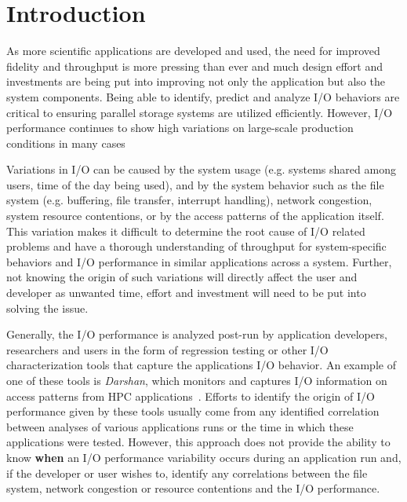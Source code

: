 \section{Introduction}
As more scientific applications are developed and used, the need for
improved fidelity and throughput is more pressing than ever and much
design effort and investments are being put into improving not only
the application but also the system components. Being able to
identify, predict and analyze I/O behaviors are critical to ensuring
parallel storage systems are utilized efficiently. However, I/O
performance continues to show high variations on large-scale
production conditions in many cases~\cite{costa2021}

Variations in I/O can be caused by the system usage (e.g. systems
shared among users, time of the day being used), and by the system
behavior such as the file system (e.g. buffering, file transfer,
interrupt handling), network congestion, system resource contentions,
or by the access patterns of the application itself. 
This variation
makes it difficult to determine the root cause of I/O related problems
and have a thorough understanding of throughput for system-specific
behaviors and I/O performance in similar applications across a
system. Further, not knowing the origin of such variations will
directly affect the user and developer as unwanted time, effort and
investment will need to be put into solving the issue.

Generally, the I/O performance is analyzed post-run by application
developers, researchers and users in the form of regression testing or
other I/O characterization tools that capture the applications I/O
behavior. An example of one of these tools is \emph{Darshan}, which
monitors and captures I/O information on access patterns from HPC
applications~\cite{Darshan}.
Efforts to identify the origin of I/O performance given by these tools
usually come from any identified correlation between analyses of
various applications runs or the time in which these applications were
tested. However, this approach does not provide the ability to know
\textbf{when} an I/O performance variability occurs during an
application run and, if the developer or user wishes to, identify any
correlations between the file system, network congestion or resource
contentions and the I/O performance.

